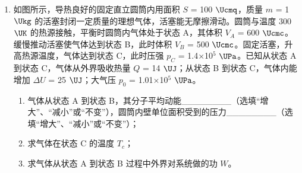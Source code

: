 \documentclass[\gkver]{gaokaozhenti}
\begin{document}
\begin{enumerate}
{B．“用油膜法估测油酸分子的大小”实验中，滴入油酸酒精溶液后，需待油酸溶液全部散开，形状稳定后，用一玻璃板轻轻盖在浅盘上，然后用水笔把油酸溶液的轮廓画在玻璃板上，测出油膜面积，故 B 错误；

C．“观察光敏电阻特性”实验中，光照强度增加，光敏电阻阻值减小；“观察金属热电阻特性”实验中，温度升高，金属热电阻阻值增大，故 C 正确；

D．“探究变压器原、副线圈电压与匝数的关系”实验中，如果可拆变压器的“横梁”铁芯没装上，原线圈接入 10 $\UV$ 的交流电时，变压器的效果减弱，副线圈磁通量还是会发生变化，副线圈输出电压不为零，故 D 正确。

故选 CD。
}

\item
如图所示，导热良好的固定直立圆筒内用面积 $S$ = 100 $\Ucmq$，质量 $m$ = 1 $\Ukg$ 的活塞封闭一定质量的理想气体，活塞能无摩擦滑动。圆筒与温度 300 $\UK$ 的热源接触，平衡时圆筒内气体处于状态 A，其体积 $V_{A}$ = 600 $\Ucmc$。缓慢推动活塞使气体达到状态 B，此时体积 $V_{B}$ = 500 $\Ucmc$。固定活塞，升高热源温度，气体达到状态 C，此时压强 $p_{C}$ = 1.4$\times$10$^{5}$ $\UPa$。已知从状态 A 到状态 C，气体从外界吸收热量 $Q$ = 14 $\UJ$；从状态 B 到状态 C，气体内能增加 $\Delta U$ = 25 $\UJ$；大气压 $p_{0}$ = 1.01$\times$10$^{5}$ $\UPa$。
\begin{enumerate}
	\item
	气体从状态 A 到状态 B，其分子平均动能\_\_\_\_\_\_\_\_（选填“增大”、“减小”或“不变”），圆筒内壁单位面积受到的压力\_\_\_\_\_\_\_\_（选填“增大”、“减小”或“不变”）；
	\item
	求气体在状态 C 的温度 $T_{c}$；
	\item
	求气体从状态 A 到状态 B 过程中外界对系统做的功 $W$。
\end{enumerate}
\end{enumerate}
\end{document}
